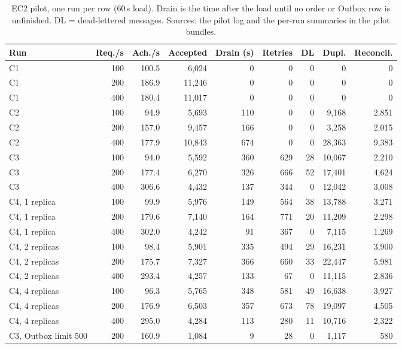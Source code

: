\documentclass[a4paper]{report}
\begin{document}
\begin{table}[tbp]
\centering
\scriptsize
\caption{EC2 pilot, one run per row (60\,s load). Drain is the time after the
load until no order or Outbox row is unfinished. DL = dead-lettered messages.
Sources: the pilot log and the
per-run summaries in the pilot bundles.}
\label{tab:pilot-errors}
\begin{adjustbox}{max width=\linewidth}
\begin{tabular}{@{}lrrrrrrrr@{}}
\toprule
Run & Req./s & Ach./s & Accepted & Drain (s) & Retries & DL & Dupl. & Reconcil. \\
\midrule
C1 & 100 & 100.5 & 6,024 & 0 & 0 & 0 & 0 & 0 \\
C1 & 200 & 186.9 & 11,246 & 0 & 0 & 0 & 0 & 0 \\
C1 & 400 & 180.4 & 11,017 & 0 & 0 & 0 & 0 & 0 \\
C2 & 100 & 94.9 & 5,693 & 110 & 0 & 0 & 9,168 & 2,851 \\
C2 & 200 & 157.0 & 9,457 & 166 & 0 & 0 & 3,258 & 2,015 \\
C2 & 400 & 177.9 & 10,843 & 674 & 0 & 0 & 28,363 & 9,383 \\
C3 & 100 & 94.0 & 5,592 & 360 & 629 & 28 & 10,067 & 2,210 \\
C3 & 200 & 177.4 & 6,270 & 326 & 666 & 52 & 17,401 & 4,624 \\
C3 & 400 & 306.6 & 4,432 & 137 & 344 & 0 & 12,042 & 3,008 \\
C4, 1 replica & 100 & 99.9 & 5,976 & 149 & 564 & 38 & 13,788 & 3,271 \\
C4, 1 replica & 200 & 179.6 & 7,140 & 164 & 771 & 20 & 11,209 & 2,298 \\
C4, 1 replica & 400 & 302.0 & 4,242 & 91 & 367 & 0 & 7,115 & 1,269 \\
C4, 2 replicas & 100 & 98.4 & 5,901 & 335 & 494 & 29 & 16,231 & 3,900 \\
C4, 2 replicas & 200 & 175.7 & 7,327 & 366 & 660 & 33 & 22,447 & 5,981 \\
C4, 2 replicas & 400 & 293.4 & 4,257 & 133 & 67 & 0 & 11,115 & 2,836 \\
C4, 4 replicas & 100 & 96.3 & 5,765 & 348 & 581 & 49 & 16,638 & 3,927 \\
C4, 4 replicas & 200 & 176.9 & 6,503 & 357 & 673 & 78 & 19,097 & 4,505 \\
C4, 4 replicas & 400 & 295.0 & 4,284 & 113 & 280 & 11 & 10,716 & 2,322 \\
\midrule
C3, Outbox limit 500 & 200 & 160.9 & 1,084 & 9 & 28 & 0 & 1,117 & 580 \\

\end{tabular}
\end{adjustbox}
\end{table}
\end{document}
